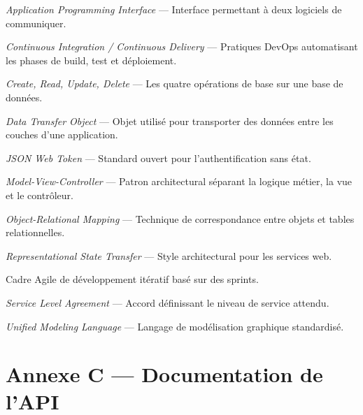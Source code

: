 \begin{description}[leftmargin=3cm, style=sameline]
  \item[\textbf{API}]  \textit{Application Programming Interface} —
        Interface permettant à deux logiciels de communiquer.
  \item[\textbf{CI/CD}] \textit{Continuous Integration / Continuous Delivery} —
        Pratiques DevOps automatisant les phases de build, test et déploiement.
  \item[\textbf{CRUD}] \textit{Create, Read, Update, Delete} —
        Les quatre opérations de base sur une base de données.
  \item[\textbf{DTO}]  \textit{Data Transfer Object} —
        Objet utilisé pour transporter des données entre les couches
        d'une application.
  \item[\textbf{JWT}]  \textit{JSON Web Token} —
        Standard ouvert pour l'authentification sans état.
  \item[\textbf{MVC}]  \textit{Model-View-Controller} —
        Patron architectural séparant la logique métier, la vue et le contrôleur.
  \item[\textbf{ORM}]  \textit{Object-Relational Mapping} —
        Technique de correspondance entre objets et tables relationnelles.
  \item[\textbf{REST}] \textit{Representational State Transfer} —
        Style architectural pour les services web.
  \item[\textbf{Scrum}] Cadre Agile de développement itératif basé sur des sprints.
  \item[\textbf{SLA}]  \textit{Service Level Agreement} —
        Accord définissant le niveau de service attendu.
  \item[\textbf{UML}]  \textit{Unified Modeling Language} —
        Langage de modélisation graphique standardisé.
  \item[\todo{Terme}]  
\end{description}

\section{Annexe C — Documentation de l'API}
\label{ann:api}



